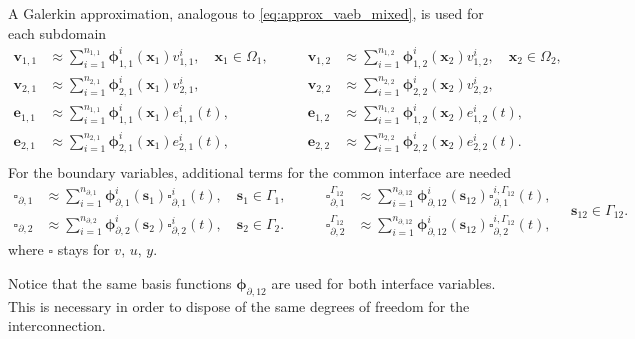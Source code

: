 A Galerkin approximation, analogous to \eqref{eq:approx_vaeb_mixed}, is used for each subdomain
\begin{equation}
\begin{aligned}
\bm{v}_{1, 1} &\approx \sum_{i=1}^{n_{1, 1}} \bm{\phi}_{1, 1}^i(\bm{x}_1) v_{1, 1}^i, \quad \bm{x}_1 \in \Omega_1, \\
\bm{v}_{2, 1} &\approx \sum_{i=1}^{n_{2, 1}} \bm{\phi}_{2, 1}^i(\bm{x}_1) v_{2, 1}^i, \\
\bm{e}_{1, 1} &\approx \sum_{i=1}^{n_{1, 1}} \bm{\phi}_{1, 1}^i(\bm{x}_1) e_{1, 1}^i(t), \\
\bm{e}_{2, 1} &\approx \sum_{i=1}^{n_{2, 1}} \bm{\phi}_{2, 1}^i(\bm{x}_1) e_{2, 1}^i(t),  \\
\end{aligned}  \qquad 
\begin{aligned}
\bm{v}_{1, 2} &\approx \sum_{i=1}^{n_{1, 2}} \bm{\phi}_{1, 2}^i(\bm{x}_2) v_{1, 2}^i, \quad \bm{x}_2 \in \Omega_2, \\
\bm{v}_{2, 2} &\approx \sum_{i=1}^{n_{2, 2}} \bm{\phi}_{2, 2}^i(\bm{x}_2) v_{2, 2}^i, \\
\bm{e}_{1, 2} &\approx \sum_{i=1}^{n_{1, 2}} \bm{\phi}_{1, 2}^i(\bm{x}_2) e_{1, 2}^i(t), \\
\bm{e}_{2, 2} &\approx \sum_{i=1}^{n_{2, 2}} \bm{\phi}_{2, 2}^i(\bm{x}_2) e_{2, 2}^i(t).  \\
\end{aligned} 
\end{equation}
For the boundary variables, additional terms for the common interface are needed 
\begin{equation}\label{eq:approx_vuy_int}
\begin{aligned}
\bm{\square}_{\partial, 1} &\approx \sum_{i=1}^{n_{\partial, 1}} \bm{\phi}_{\partial, 1}^i(\bm{s}_1) \square_{\partial, 1}^i(t), \quad \bm{s}_1 \in \Gamma_1, \\
\bm{\square}_{\partial, 2} &\approx \sum_{i=1}^{n_{\partial, 2}} \bm{\phi}_{\partial, 2}^i(\bm{s}_2) \square_{\partial, 2}^i(t), \quad \bm{s}_2 \in \Gamma_2.
\end{aligned} \qquad
\begin{aligned}
\bm{\square}_{\partial, 1}^{\Gamma_{12}} &\approx \sum_{i=1}^{n_{\partial, 12}} \bm{\phi}_{\partial, 12}^i(\bm{s}_{12}) \square_{\partial, 1}^{i, \Gamma_{12}}(t), \\
\bm{\square}_{\partial, 2}^{\Gamma_{12}}  &\approx \sum_{i=1}^{n_{\partial, 12}} \bm{\phi}_{\partial, 12}^i(\bm{s}_{12}) \square_{\partial, 2}^{i, \Gamma_{12}}(t), 
\end{aligned} \quad \bm{s}_{12} \in \Gamma_{12}.
\end{equation}
where $\square$ stays for $v,\, u,\, y$. 
\begin{remark}
Notice that the same basis functions $\bm{\phi}_{\partial, 12}$ are used for both interface variables. This is necessary in order to dispose of the same degrees of freedom for the interconnection.
\end{remark}

